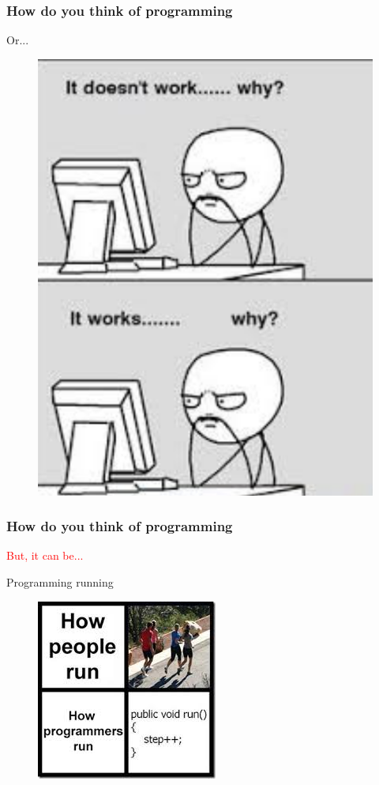 \documentclass{beamer}
\begin{document}
\begin{frame}
  \frametitle{How do you think of programming}
  \begin{center}
    \huge{Or...}
    \begin{figure}
      \includegraphics[scale=.25]{./img/pain2.png}
    \end{figure}
  \end{center}
\end{frame}

\begin{frame}
  \frametitle{How do you think of programming}
  \Huge {\textcolor{red}{But, it can be...}}
  
  \huge{Programming running}
  \begin{center}
    \begin{figure}
      \includegraphics[scale=.6]{./img/joke1.jpeg}
    \end{figure}
  \end{center}
  
\end{frame}
\end{document}
